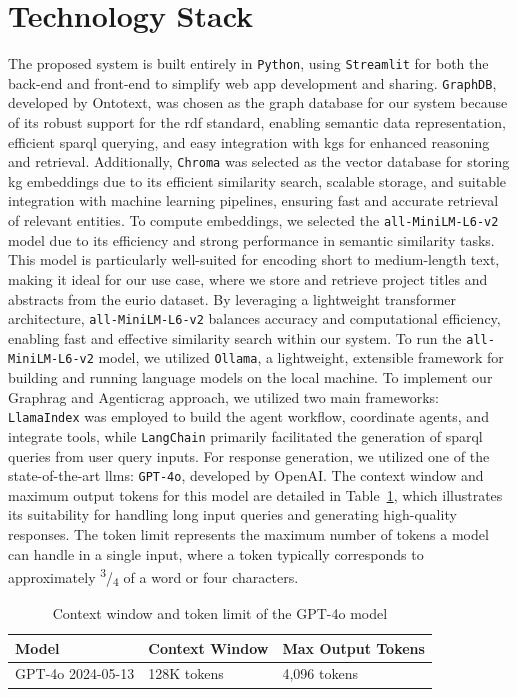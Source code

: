 \section{Technology Stack}\label{sec:technology-stack}
The proposed system is built entirely in \texttt{Python}, using \texttt{Streamlit} for both the back-end and front-end to simplify web app development and sharing.
\texttt{GraphDB}, developed by Ontotext, was chosen as the graph database for our system because of its robust support for the \gls{rdf} standard, enabling semantic data representation, efficient \gls{sparql} querying, and easy integration with \glspl{kg} for enhanced reasoning and retrieval.
Additionally, \texttt{Chroma} was selected as the vector database for storing \gls{kg} embeddings due to its efficient similarity search, scalable storage, and suitable integration with machine learning pipelines, ensuring fast and accurate retrieval of relevant entities.
To compute embeddings, we selected the \texttt{all-MiniLM-L6-v2} model due to its efficiency and strong performance in semantic similarity tasks.
This model is particularly well-suited for encoding short to medium-length text, making it ideal for our use case, where we store and retrieve project titles and abstracts from the \gls{eurio} dataset.
By leveraging a lightweight transformer architecture, \texttt{all-MiniLM-L6-v2} balances accuracy and computational efficiency, enabling fast and effective similarity search within our system.
To run the \texttt{all-MiniLM-L6-v2} model, we utilized \texttt{Ollama}, a lightweight, extensible framework for building and running language models on the local machine.
To implement our Graph\gls{rag} and Agentic\gls{rag} approach, we utilized two main frameworks: \texttt{LlamaIndex} was employed to build the agent workflow, coordinate agents, and integrate tools, while \texttt{LangChain} primarily facilitated the generation of \gls{sparql} queries from user query inputs.
For response generation, we utilized one of the state-of-the-art \glspl{llm}: \texttt{GPT-4o}, developed by OpenAI.
The context window and maximum output tokens for this model are detailed in Table~\ref{table:gpt-4o-tokens}, which illustrates its suitability for handling long input queries and generating high-quality responses.
The token limit represents the maximum number of tokens a model can handle in a single input, where a token typically corresponds to approximately \textsuperscript{3}/\textsubscript{4} of a word or four characters.

\begin{table}[htbp]
    \centering
    \begin{tabularx}{\textwidth}{|X|X|X|}
      \hline
      \textbf{Model} & \textbf{Context Window} & \textbf{Max Output Tokens}\\
      \hline
      GPT-4o 2024-05-13 & 128K tokens & 4,096 tokens\\
      \hline
    \end{tabularx}
    \caption{Context window and token limit of the GPT-4o model}
    \label{table:gpt-4o-tokens}
\end{table}

